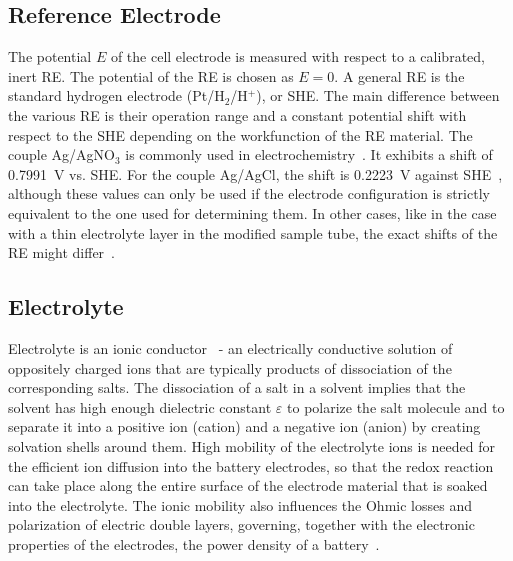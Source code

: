 \subsection{Reference Electrode}
The potential $E$ of the cell electrode is measured with respect to a calibrated, inert RE. The potential of the RE is chosen as $E=0$. A general RE is the standard hydrogen electrode (Pt/H$_2$/H$^+$), or SHE. The main difference between the various RE is their operation range and a constant potential shift with respect to the SHE depending on the workfunction of the RE material. The couple Ag/AgNO$_3$ is commonly used in electrochemistry~\cite{Bard_book}. It exhibits a shift of 0.7991~V vs. SHE. For the couple Ag/AgCl, the shift is 0.2223~V against SHE~\cite{Bard_book,DOM}, although these values can only be used if the electrode configuration is strictly equivalent to the one used for determining them. In other cases, like in the case with a thin electrolyte layer in the modified sample tube, the exact shifts of the RE might differ~\cite{DOM}.\\


\subsection{Electrolyte}

Electrolyte is an ionic conductor~\cite{Bard_book} - an electrically conductive solution of oppositely charged ions that are typically products of dissociation of the corresponding salts. The dissociation of a salt in a solvent implies that the solvent has high enough dielectric constant $\varepsilon$ to polarize the salt molecule and to separate it into a positive ion (cation) and a negative ion (anion) by creating solvation shells around them. High mobility of the electrolyte ions is needed for the efficient ion diffusion into the battery electrodes, so that the redox reaction can take place along the entire surface of the electrode material that is soaked into the electrolyte. The ionic mobility also influences the Ohmic losses and polarization of electric double layers, governing, together with the electronic properties of the electrodes, the power density of a battery~\cite{Neueder2014}.\\


